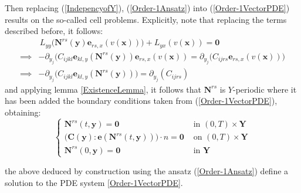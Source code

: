 Then replacing (\ref{IndepencyofY}), (\ref{Order-1Ansatz}) into (\ref{Order-1VectorPDE}) results on the so-called cell problems. Explicitly, note that replacing the terms described before, it follows:
\begin{align*}
    &\,L_{yy} \big( \mathbf{N}^{rs} (\mathbf{y}) \mathbf{e}_{rs,x} (v(\mathbf{x})) \big) + L_{yx}(v(\mathbf{x}) ) = \mathbf{0} \\
    \implies& -\partial_{y_j} \big( C_{ijkl}\mathbf{e}_{kl,y}(\mathbf{N}^{rs}(\mathbf{y}) ) \mathbf{e}_{rs,x}(v(\mathbf{x})) = \partial_{y_j} \big( C_{ijrs}\mathbf{e}_{rs,x}(v(\mathbf{x})) \big) \\
    \implies& - \partial_{y_j} \big( C_{ijkl} \mathbf{e}_{kl,y} (\mathbf{N}^{rs}(\mathbf{y})) \big) = \partial_{y_j} (C_{ijrs})
\end{align*}
and applying lemma \ref{ExistenceLemma}, it follows that $\mathbf{N}^{rs}$ is $Y$-periodic where it has been added the boundary conditions taken from (\ref{Order-1VectorPDE}), obtaining:
\begin{equation*}
    \left \{
    \begin{array}{cc}
        \mathbf{N}^{rs}(t, \mathbf{y}) = \mathbf{0} & \text{ in } (0,T)\times \mathbf{Y} \\
        \big( \mathbf{C}(\mathbf{y}) : \mathbf{e}(\mathbf{N}^{rs}(t,\mathbf{y})) \big) \cdot n = \mathbf{0} & \text{ on } (0,T)\times \mathbf{Y}\\
        \mathbf{N}^{rs} (0, \mathbf{y}) = \mathbf{0} &  \text{ in } \mathbf{Y}
    \end{array}
    \right.
\end{equation*}

the above deduced by construction using the ansatz (\ref{Order-1Ansatz}) define a solution to the PDE system \ref{Order-1VectorPDE}.

